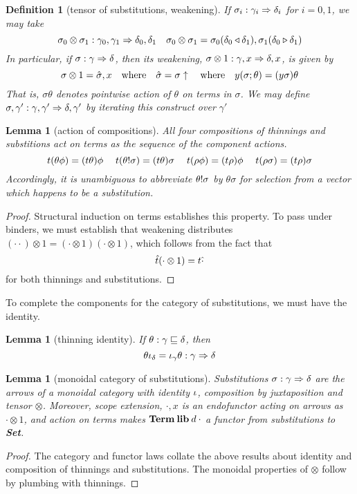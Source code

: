 \documentclass{jfp1}
\newtheorem{lemma}[theorem]{Lemma}
\newtheorem{definition}[theorem]{Definition}
\newcommand{\Set}{\textbf{Set}}
\begin{document}
\begin{definition}[tensor of substitutions, weakening]
  If $\sigma_i : \gamma_i\Rightarrow\delta_i$ for $i=0,1$, we may take
  \[
    \sigma_0\otimes\sigma_1 : \gamma_0,\gamma_1 \Rightarrow \delta_0,\delta_1
    \quad
    \sigma_0\otimes\sigma_1 = \sigma_0(\delta_0 \triangleleft \delta_1),\sigma_1(\delta_0 \triangleright \delta_1)
  \]
  In particular, if $\sigma : \gamma\Rightarrow\delta$, then its weakening,
  $\sigma\otimes1 : \gamma,x\Rightarrow\delta,x$,
  is given by
  \[\sigma\otimes1 = \hat\sigma,x  \quad\mbox{where}\quad \hat\sigma = \sigma\uparrow
     \quad\mbox{where}\quad y(\sigma;\theta) = (y\sigma)\theta
  \]
  That is, $\sigma\theta$ denotes pointwise action of $\theta$ on terms in $\sigma$.
  We may define $\sigma,\gamma' : \gamma,\gamma' \Rightarrow \delta,\gamma'$ by iterating this construct
  over $\gamma'$
\end{definition}


\begin{lemma}[action of compositions]
  All four compositions of thinnings and substitions act on terms as the sequence of the
  component actions.
  \[
    t(\theta\phi) = (t\theta)\phi \quad\;
    t(\theta!\sigma) = (t\theta)\sigma \quad\;
    t(\rho\phi) = (t\rho)\phi \quad\;
    t(\rho\sigma) = (t\rho)\sigma
  \]
  Accordingly, it is unambiguous to abbreviate $\theta!\sigma$ by $\theta\sigma$ for
  selection from a vector which happens to be a substitution.
\end{lemma}
\begin{proof}
  Structural induction on terms establishes this property. To pass under binders, we must
  establish that weakening distributes $(\cdot\cdot)\otimes1 = (\cdot\otimes1)(\cdot\otimes1)$, which follows from
  the fact that
  \[
    \hat t(\cdot\otimes1) = t\hat\cdot
  \]
  for both thinnings and substitutions.
\end{proof}

To complete the components for the category of substitutions, we must have the identity.

\begin{lemma}[thinning identity]
  If $\theta:\gamma\sqsubseteq\delta$, then
  \[
    \theta\iota_\delta = \iota_\gamma\theta : \gamma\Rightarrow\delta
    \]
\end{lemma}

\begin{lemma}[monoidal category of substitutions]
  Substitutions $\sigma : \gamma\Rightarrow\delta$ are the arrows of a
  monoidal category with identity $\iota$,
  composition by juxtaposition
  and tensor $\otimes$. Moreover, scope extension, $\cdot,x$ is an endofunctor acting
  on arrows as $\cdot\otimes1$, and action on terms makes $\mathbf{Term}\:\textbf{lib}\:d\:\cdot$ a functor
  from substitutions to \Set.
\end{lemma}
\begin{proof}
  The category and functor laws collate the above results about identity and composition
  of thinnings and substitutions. The monoidal properties of $\otimes$
  follow by plumbing with thinnings.
\end{proof}
\end{document}
